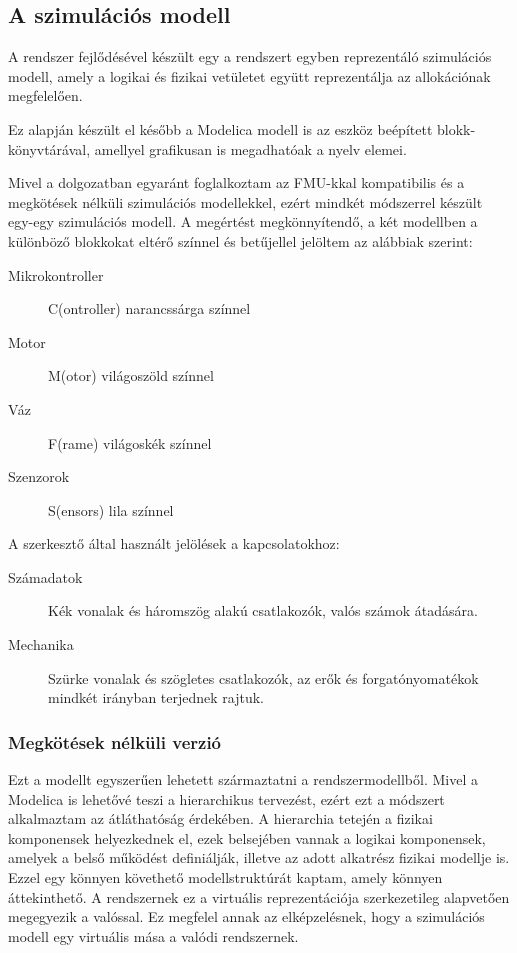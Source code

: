     \subsection{A szimulációs modell}
    A rendszer fejlődésével készült egy a rendszert egyben reprezentáló szimulációs modell, amely a logikai és fizikai vetületet együtt reprezentálja az allokációnak megfelelően.
    
    Ez alapján készült el később a Modelica modell is az eszköz beépített blokk-könyvtárával, amellyel grafikusan is megadhatóak a nyelv elemei.
    
    Mivel a dolgozatban egyaránt foglalkoztam az FMU-kkal kompatibilis és a megkötések nélküli szimulációs modellekkel, ezért mindkét módszerrel készült egy-egy szimulációs modell.
    A megértést megkönnyítendő, a két modellben a különböző blokkokat eltérő színnel és betűjellel jelöltem az alábbiak szerint:

    \begin{description}
        \item[Mikrokontroller] C(ontroller) narancssárga színnel
        \item[Motor] M(otor) világoszöld színnel
        \item[Váz] F(rame) világoskék színnel
        \item[Szenzorok] S(ensors) lila színnel
    \end{description}

    A szerkesztő által használt jelölések a kapcsolatokhoz:

    \begin{description}
        \item[Számadatok] Kék vonalak és háromszög alakú csatlakozók, valós számok átadására.
        \item[Mechanika] Szürke vonalak és szögletes csatlakozók, az erők és forgatónyomatékok mindkét irányban terjednek rajtuk.
    \end{description}

        \subsubsection{Megkötések nélküli verzió}
        Ezt a modellt egyszerűen lehetett származtatni a rendszermodellből. Mivel a Modelica is lehetővé teszi a hierarchikus tervezést, ezért ezt a módszert alkalmaztam az átláthatóság érdekében.
        A hierarchia tetején a fizikai komponensek helyezkednek el, ezek belsejében vannak a logikai komponensek, amelyek a belső működést definiálják, illetve az adott alkatrész fizikai modellje is.
        Ezzel egy könnyen követhető modellstruktúrát kaptam, amely könnyen áttekinthető. A rendszernek ez a virtuális reprezentációja szerkezetileg alapvetően megegyezik a valóssal.
        Ez megfelel annak az elképzelésnek, hogy a szimulációs modell egy virtuális mása a valódi rendszernek.

